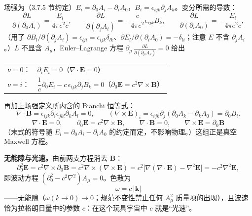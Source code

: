 场强为（3.7.5 节约定）$E_i=\partial_0A_i-\partial_iA_0$，$B_i=\epsilon_{ijk}\partial_jA_k$。变分所需的导数：
\begin{equation*}
\frac{\partial L}{\partial(\partial_0A_i)}=\frac{E_i}{4\pi e^{2}c},\qquad
\frac{\partial L}{\partial(\partial_jA_i)}=-\frac{c}{4\pi e^{2}}\epsilon_{ijk}B_k,\qquad
\frac{\partial L}{\partial(\partial_iA_0)}=-\frac{E_i}{4\pi e^{2}c},
\end{equation*}
（用了 $\partial B_l/\partial(\partial_jA_i)=\epsilon_{lji}=\epsilon_{ijk}\delta_{lk}$、$\partial E_l/\partial(\partial_iA_0)=-\delta_{li}$；注意 $E$ 不含 $\partial_jA_i$。）$L$ 不显含 $A_\mu$，Euler--Lagrange 方程 $\partial_\mu\,\frac{\partial L}{\partial(\partial_\mu A_\nu)}=0$ 给出

\begin{center}
\begin{tabular}{ll}
$\nu=0$：& $\partial_iE_i=0$\hfill（$\nabla\cdot\pmb{E}=0$）\\[2pt]
$\nu=i$：& $\dfrac{1}{c}\partial_0E_i-c\,\epsilon_{ijk}\partial_jB_k=0$\hfill（$\partial_0\pmb{E}=c^{2}\nabla\times\pmb{B}$）
\end{tabular}
\end{center}
再加上场强定义所内含的 Bianchi 恒等式：
\begin{equation*}
\nabla\cdot\pmb{B}=\epsilon_{ijk}\partial_i\epsilon_{jkl}\partial_kA_l=0,
\qquad
(\nabla\times\pmb{E})_i=\epsilon_{ijk}\partial_j(\partial_0A_k-\partial_kA_0)=\partial_0B_i .
\end{equation*}
\begin{equation*}
\boxed{\;\nabla\cdot\pmb{E}=0,\qquad
\partial_0\pmb{E}=c^{2}\nabla\times\pmb{B},\qquad
\nabla\cdot\pmb{B}=0,\qquad
\nabla\times\pmb{E}=\partial_0\pmb{B}\;}
\end{equation*}
（末式的符号随 $E_i=\partial_0A_i-\partial_iA_0$ 的约定而定，不影响物理。）这组正是真空 Maxwell 方程。

\textbf{无能隙与光速。}由前两支方程消去 $\pmb{B}$：
\begin{equation*}
\partial_0^{2}\pmb{E}=c^{2}\nabla\times\partial_0\pmb{B}
=c^{2}\nabla\times(\nabla\times\pmb{E})
=c^{2}\big[\nabla(\nabla\cdot\pmb{E})-\nabla^{2}\pmb{E}\big]
=-c^{2}\nabla^{2}\pmb{E},
\end{equation*}
即波动方程 $(\partial_0^{2}-c^{2}\nabla^{2})A_\mu=0$。色散为
\begin{equation*}
\boxed{\;\omega=c\,|\pmb{k}|\;}
\end{equation*}
——无能隙（$\omega(k\to0)\to0$；规范不变性禁止任何 $A_\mu^{2}$ 质量项的出现），且波速恰为拉格朗日量中的参数 $c$：在这个玩具宇宙中 $c$ 就是“光速”。

